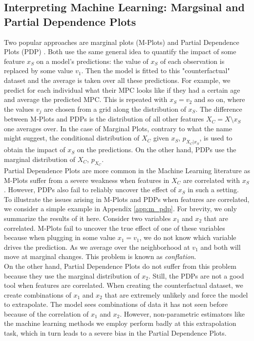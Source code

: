 \subsection{Interpreting Machine Learning: Margsinal and Partial Dependence Plots} \label{subsec:m_pdp}
Two popular approaches are marginal plots (M-Plots) \citep{molnar_2019} and Partial Dependence Plots (PDP) \citep{friedman_2001}. Both use the same general idea to quantify the impact of some feature $x_S$ on a model's predictions: the value of $x_S$ of each observation is replaced by some value $v_1$. Then the model is fitted to this "counterfactual" dataset and the average is taken over all these predictions. For example, we predict for each individual what their MPC looks like if they had a certain age and average the predicted MPC. This is repeated with $x_S=v_2$ and so on, where the values $v_j$ are chosen from a grid along the distribution of $x_S$. The difference between M-Plots and PDPs is the distribution of all other features $X_C=X\setminus x_S$ one averages over. In the case of Marginal Plots, contrary to what the name might suggest, the conditional distribution of $X_C$ given $x_S$, $p_{X_C|x_S}$, is used to obtain the impact of $x_S$ on the predictions. On the other hand, PDPs use the marginal distribution of $X_C$, $p_{X_C}$. \\
Partial Dependence Plots are more common in the Machine Learning literature as M-Plots suffer from a severe weakness when features in $X_C$ are correlated with $x_S$. However, PDPs also fail to reliably uncover the effect of $x_S$ in such a setting. \\
To illustrate the issues arising in M-Plots and PDPs when features are correlated, we consider a simple example in Appendix \ref{app:m_pdp}. For brevity, we only summarize the results of it here. Consider two variables $x_1$ and $x_2$ that are correlated. M-Plots fail to uncover the true effect of one of these variables because when plugging in some value $x_1=v_1$, we do not know which variable drives the prediction. As we average over the neighborhood at $v_1$ and both will move at marginal changes. This problem is known as \textit{conflation}. \\
On the other hand, Partial Dependence Plots do not suffer from this problem because they use the marginal distribution of $x_2$. 
Still, the PDPs are not a good tool when features are correlated. When creating the counterfactual dataset, we create combinations of $x_1$ and $x_2$ that are extremely unlikely and force the model to extrapolate. The model sees combinations of data it has not seen before because of the correlation of $x_1$ and $x_2$. However, non-parametric estimators like the machine learning methods we employ perform badly at this extrapolation task, which in turn leads to a severe bias in the Partial Dependence Plots. \citep{apleyzhu_2020} \\
